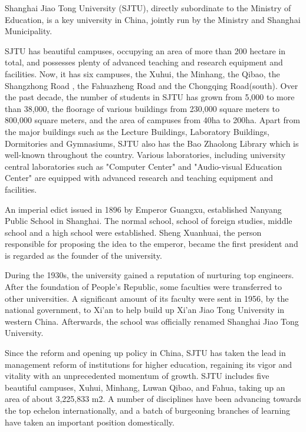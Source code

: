 

\begin{bigabstract}
  Shanghai Jiao Tong University (SJTU), directly subordinate to the Ministry of Education, is a key university in China, jointly run by the Ministry and Shanghai Municipality.

  SJTU has beautiful campuses, occupying an area of more than 200 hectare in total, and possesses plenty of advanced teaching and research equipment and facilities. Now, it has six campuses, the Xuhui, the Minhang, the Qibao, the Shangzhong Road , the Fahuazheng Road and the Chongqing Road(south). Over the past decade, the number of students in SJTU has grown from 5,000 to more than 38,000, the floorage of various buildings from 230,000 square meters to 800,000 square meters, and the area of campuses from 40ha to 200ha. Apart from the major buildings such as the Lecture Buildings, Laboratory Buildings, Dormitories and Gymnasiums, SJTU also has the Bao Zhaolong Library which is well-known throughout the country. Various laboratories, including university central laboratories such as "Computer Center" and "Audio-visual Education Center" are equipped with advanced research and teaching equipment and facilities.

An imperial edict issued in 1896 by Emperor Guangxu, established Nanyang Public School in Shanghai. The normal school, school of foreign studies, middle school and a high school were established. Sheng Xuanhuai, the person responsible for proposing the idea to the emperor, became the first president and is regarded as the founder of the university.

During the 1930s, the university gained a reputation of nurturing top engineers. After the foundation of People's Republic, some faculties were transferred to other universities. A significant amount of its faculty were sent in 1956, by the national government, to Xi'an to help build up Xi'an Jiao Tong University in western China. Afterwards, the school was officially renamed Shanghai Jiao Tong University.

Since the reform and opening up policy in China, SJTU has taken the lead in management reform of institutions for higher education, regaining its vigor and vitality with an unprecedented momentum of growth. SJTU includes five beautiful campuses, Xuhui, Minhang, Luwan Qibao, and Fahua, taking up an area of about 3,225,833 m2. A number of disciplines have been advancing towards the top echelon internationally, and a batch of burgeoning branches of learning have taken an important position domestically.


\end{bigabstract}
